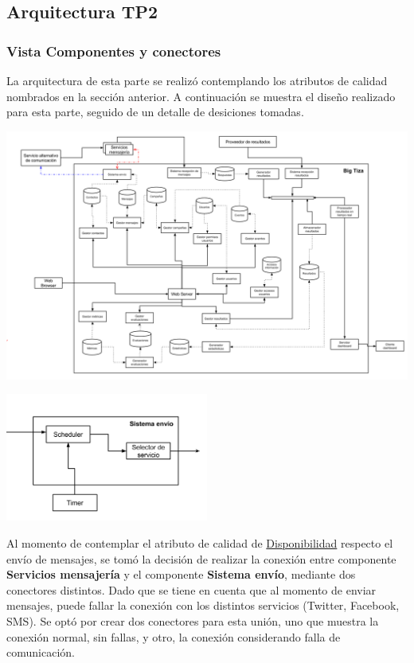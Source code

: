 \documentclass[a4paper, 11pt]{article}
\begin{document}
\newpage
\subsection{Arquitectura TP2}
\subsubsection{Vista Componentes y conectores}
La arquitectura de esta parte se realizó contemplando los atributos de calidad nombrados en la sección anterior. A continuación se muestra el dise\~no realizado para esta parte, seguido de un detalle de desiciones tomadas.

\centerline{\includegraphics[width=1.2\textwidth]{./diagramas/VistaCompyCon.png}}
\centerline{\includegraphics[width=0.5\textwidth]{./diagramas/ArqTP2conector1.png}}

Al momento de contemplar el atributo de calidad de \underline{Disponibilidad} respecto el envío de mensajes, se tomó la decisión de realizar la conexión entre componente \textbf{Servicios mensajería} y el componente \textbf{Sistema envío}, mediante dos conectores distintos. Dado que se tiene en cuenta que al momento de enviar mensajes, puede fallar la conexión con los distintos servicios (Twitter, Facebook, SMS). 
Se optó por crear dos conectores para esta unión, uno que muestra la conexión normal, sin fallas, y otro, la conexión considerando falla de comunicación.\\
\end{document}
